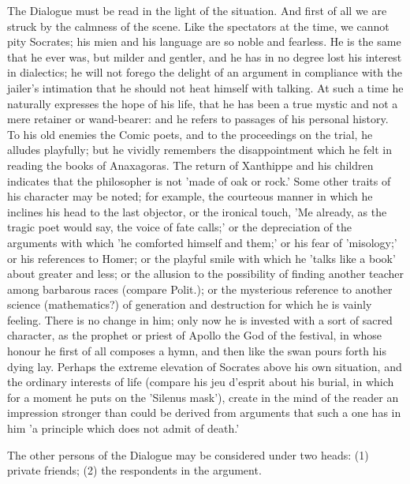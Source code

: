 The Dialogue must be read in the light of the situation. And first of
all we are struck by the calmness of the scene. Like the spectators
at the time, we cannot pity Socrates; his mien and his language are
so noble and fearless. He is the same that he ever was, but milder and
gentler, and he has in no degree lost his interest in dialectics;
he will not forego the delight of an argument in compliance with the
jailer's intimation that he should not heat himself with talking. At
such a time he naturally expresses the hope of his life, that he has
been a true mystic and not a mere retainer or wand-bearer: and he refers
to passages of his personal history. To his old enemies the Comic
poets, and to the proceedings on the trial, he alludes playfully; but he
vividly remembers the disappointment which he felt in reading the books
of Anaxagoras. The return of Xanthippe and his children indicates that
the philosopher is not 'made of oak or rock.' Some other traits of his
character may be noted; for example, the courteous manner in which
he inclines his head to the last objector, or the ironical touch, 'Me
already, as the tragic poet would say, the voice of fate calls;' or
the depreciation of the arguments with which 'he comforted himself and
them;' or his fear of 'misology;' or his references to Homer; or the
playful smile with which he 'talks like a book' about greater and less;
or the allusion to the possibility of finding another teacher among
barbarous races (compare Polit.); or the mysterious reference to another
science (mathematics?) of generation and destruction for which he is
vainly feeling. There is no change in him; only now he is invested with
a sort of sacred character, as the prophet or priest of Apollo the God
of the festival, in whose honour he first of all composes a hymn,
and then like the swan pours forth his dying lay. Perhaps the extreme
elevation of Socrates above his own situation, and the ordinary
interests of life (compare his jeu d'esprit about his burial, in which
for a moment he puts on the 'Silenus mask'), create in the mind of the
reader an impression stronger than could be derived from arguments that
such a one has in him 'a principle which does not admit of death.'

The other persons of the Dialogue may be considered under two heads: (1)
private friends; (2) the respondents in the argument.

